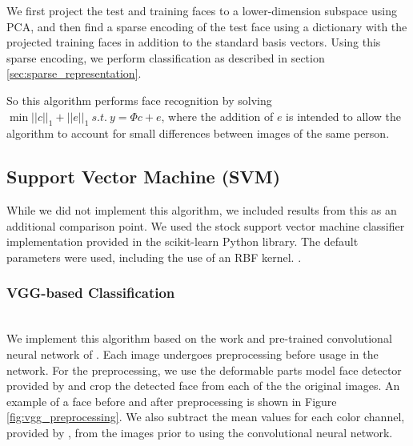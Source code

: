 \documentclass[pageno]{cos429}
\begin{document}
We first project the test and training faces to a lower-dimension subspace using PCA, and then find a sparse encoding of the test face using a dictionary with the projected training faces in addition to the standard basis vectors. Using this sparse encoding, we perform classification as described in section \ref{sec:sparse_representation}.

So this algorithm performs face recognition by solving $\min||c||_1+||e||_1\:s.t.\:y=\Phi c+e$, where the addition of $e$ is intended to allow the algorithm to account for small differences between images of the same person.

\subsection{Support Vector Machine (SVM)}
While we did not implement this algorithm, we included results from this as an additional comparison point. We used the stock support vector machine classifier implementation provided in the scikit-learn Python library. The default parameters were used, including the use of an RBF kernel. \cite{scikit-learn}.

\subsubsection{VGG-based Classification}\hspace*{\fill} \\
We implement this algorithm based on the work and pre-trained convolutional neural network of \cite{parkhi_deep_2015}. Each image undergoes preprocessing before usage in the network. For the preprocessing, we use the deformable parts model face detector provided by \cite{parkhi_deep_2015} and crop the detected face from each of the the original images. An example of a face before and after preprocessing is shown in Figure \ref{fig:vgg_preprocessing}. We also subtract the mean values for each color channel, provided by \cite{parkhi_deep_2015}, from the images prior to using the convolutional neural network.
\end{document}
